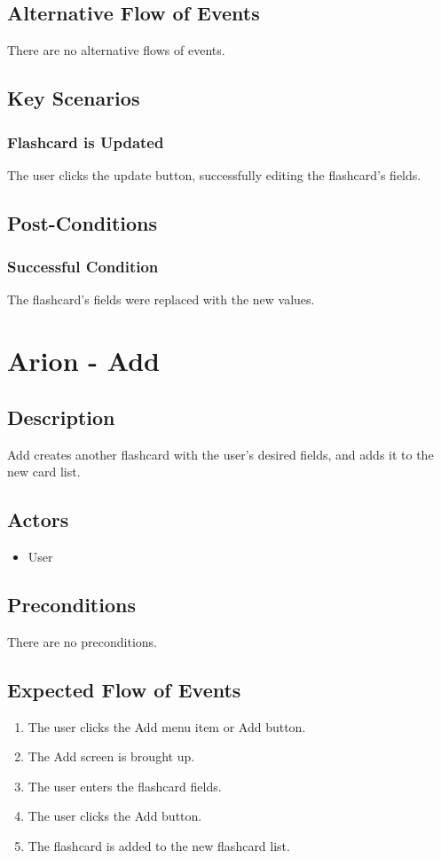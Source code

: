 \documentclass{scrreprt}
\begin{document}
\section{Alternative Flow of Events}
    There are no alternative flows of events.

\section{Key Scenarios}
    \subsection{Flashcard is Updated}
    The user clicks the update button, successfully editing the flashcard's fields.

\section{Post-Conditions}
    \subsection{Successful Condition}
    The flashcard's fields were replaced with the new values.
    

\chapter{Arion - Add}

\section{Description}
Add creates another flashcard with the user's desired fields, and adds it to
the new card list.

\section{Actors}
\begin{itemize}
    \item User
\end{itemize}

\section{Preconditions}
    There are no preconditions.

\section{Expected Flow of Events}
\begin{enumerate}[1.]
    \item The user clicks the Add menu item or Add button.
    \item The Add screen is brought up.
    \item The user enters the flashcard fields.
    \item The user clicks the Add button.
    \item The flashcard is added to the new flashcard list.
\end{enumerate}
\end{document}
